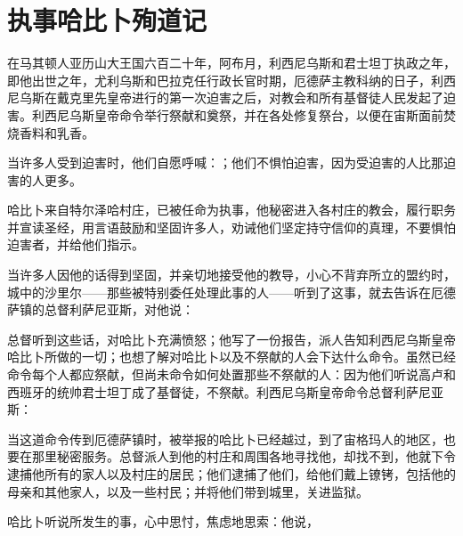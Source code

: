 
\chapter{执事哈比卜殉道记}


在马其顿人亚历山大王国六百二十年，阿布月，利西尼乌斯和君士坦丁执政之年，即他出世之年，尤利乌斯和巴拉克任行政长官时期，厄德萨主教科纳的日子，利西尼乌斯在戴克里先皇帝进行的第一次迫害之后，对教会和所有基督徒人民发起了迫害。利西尼乌斯皇帝命令举行祭献和奠祭，并在各处修复祭台，以便在宙斯面前焚烧香料和乳香。\par

当许多人受到迫害时，他们自愿呼喊：；他们不惧怕迫害，因为受迫害的人比那迫害的人更多。\par

哈比卜来自特尔泽哈村庄，已被任命为执事，他秘密进入各村庄的教会，履行职务并宣读圣经，用言语鼓励和坚固许多人，劝诫他们坚定持守信仰的真理，不要惧怕迫害者，并给他们指示。\par

当许多人因他的话得到坚固，并亲切地接受他的教导，小心不背弃所立的盟约时，城中的沙里尔——那些被特别委任处理此事的人——听到了这事，就去告诉在厄德萨镇的总督利萨尼亚斯，对他说：\par

总督听到这些话，对哈比卜充满愤怒；他写了一份报告，派人告知利西尼乌斯皇帝哈比卜所做的一切；也想了解对哈比卜以及不祭献的人会下达什么命令。虽然已经命令每个人都应祭献，但尚未命令如何处置那些不祭献的人：因为他们听说高卢和西班牙的统帅君士坦丁成了基督徒，不祭献。利西尼乌斯皇帝命令总督利萨尼亚斯：\par

当这道命令传到厄德萨镇时，被举报的哈比卜已经越过，到了宙格玛人的地区，也要在那里秘密服务。总督派人到他的村庄和周围各地寻找他，却找不到，他就下令逮捕他所有的家人以及村庄的居民；他们逮捕了他们，给他们戴上镣铐，包括他的母亲和其他家人，以及一些村民；并将他们带到城里，关进监狱。\par

哈比卜听说所发生的事，心中思忖，焦虑地思索：他说，\par

